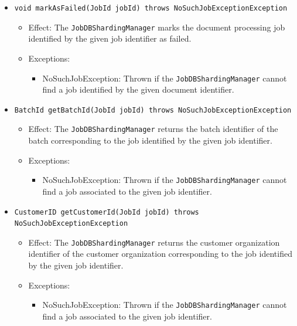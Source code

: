 \documentclass[a4paper,10pt]{article}
\begin{document}
\begin{itemize}
\begin{itemize}
  \item \texttt{void markAsFailed(JobId jobId) throws NoSuchJobExceptionException}
    	\begin{itemize}
    		\item Effect: The \texttt{JobDBShardingManager} marks the document processing job identified by the given job identifier as failed.
    		\item Exceptions:
    		\begin{itemize}
    			\item NoSuchJobException: Thrown if the \texttt{JobDBShardingManager} cannot find a job identified by the given document identifier.
    		\end{itemize}
    	\end{itemize}        	
    	
   	   \item \texttt{BatchId getBatchId(JobId jobId) throws NoSuchJobExceptionException}
    	\begin{itemize}
    		\item Effect: The \texttt{JobDBShardingManager} returns the batch identifier of the batch corresponding to the job identified by the given job identifier.
    		\item Exceptions:
    		\begin{itemize}
    			\item NoSuchJobException: Thrown if the \texttt{JobDBShardingManager} cannot find a job associated to the given job identifier.
    		\end{itemize}
    	\end{itemize}	

   	   \item \texttt{CustomerID getCustomerId(JobId jobId) throws NoSuchJobExceptionException}
    	\begin{itemize}
    		\item Effect: The \texttt{JobDBShardingManager} returns the customer organization identifier of the customer organization corresponding to the job identified by the given job identifier.
    		\item Exceptions:
    		\begin{itemize}
    			\item NoSuchJobException: Thrown if the \texttt{JobDBShardingManager} cannot find a job associated to the given job identifier.
    		\end{itemize}
    	\end{itemize}	
    	

\end{itemize}
\end{itemize}
\end{document}
